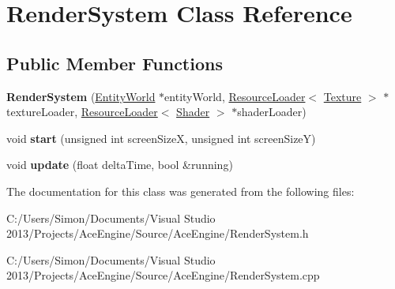 \hypertarget{class_render_system}{}\section{Render\+System Class Reference}
\label{class_render_system}
\subsection*{Public Member Functions}
\begin{DoxyCompactItemize}
\item 
\hypertarget{class_render_system_af65036a0ffb0814f91ae3aea428de1ec}{}{\bfseries Render\+System} (\hyperlink{class_entity_world}{Entity\+World} $\ast$entity\+World, \hyperlink{class_resource_loader}{Resource\+Loader}$<$ \hyperlink{struct_texture}{Texture} $>$ $\ast$texture\+Loader, \hyperlink{class_resource_loader}{Resource\+Loader}$<$ \hyperlink{struct_shader}{Shader} $>$ $\ast$shader\+Loader)\label{class_render_system_af65036a0ffb0814f91ae3aea428de1ec}

\item 
\hypertarget{class_render_system_adb1c97f7b6e3b4f85a7f0fd4d71e9bb5}{}void {\bfseries start} (unsigned int screen\+Size\+X, unsigned int screen\+Size\+Y)\label{class_render_system_adb1c97f7b6e3b4f85a7f0fd4d71e9bb5}

\item 
\hypertarget{class_render_system_aced51713f94b6f51ecf08d0520af1578}{}void {\bfseries update} (float delta\+Time, bool \&running)\label{class_render_system_aced51713f94b6f51ecf08d0520af1578}

\end{DoxyCompactItemize}


The documentation for this class was generated from the following files\+:\begin{DoxyCompactItemize}
\item 
C\+:/\+Users/\+Simon/\+Documents/\+Visual Studio 2013/\+Projects/\+Ace\+Engine/\+Source/\+Ace\+Engine/Render\+System.\+h\item 
C\+:/\+Users/\+Simon/\+Documents/\+Visual Studio 2013/\+Projects/\+Ace\+Engine/\+Source/\+Ace\+Engine/Render\+System.\+cpp\end{DoxyCompactItemize}
